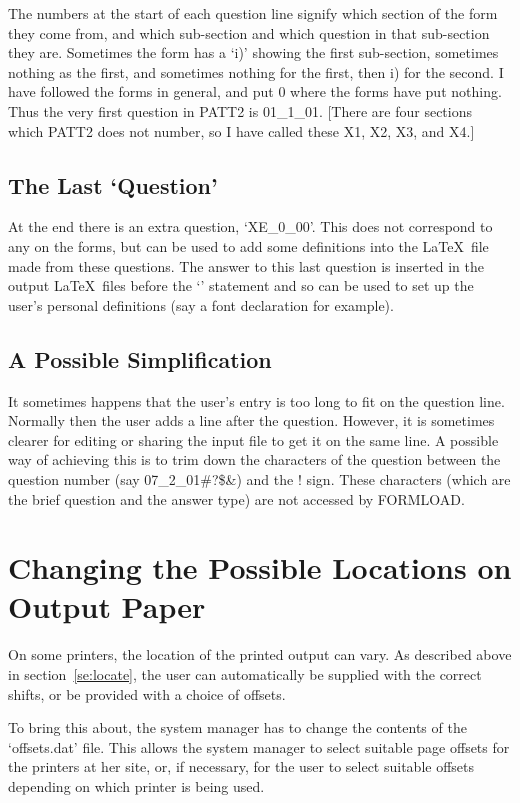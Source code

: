 The numbers at the start of each question line signify which section of the
form they come from, and which sub-section and which question in that
sub-section they are. Sometimes the form has a `i)' showing the first
sub-section, sometimes nothing as the first, and sometimes nothing for the
first, then i) for the second. I have followed the forms in general, and
put 0 where the forms have put nothing. Thus the very first question in
PATT2 is 01\_1\_01. [There are four sections which PATT2 does not number,
so I have called these X1, X2, X3, and X4.]

\subsection{The Last `Question'}

At the end there is an extra question, `XE\_0\_00'. This does not
correspond to any on the forms, but can be used to add some definitions
into the \LaTeX\ file made from these questions. The answer to this last
question is inserted in the output \LaTeX\ files before the
`\verb++' statement and so can be used to set up the user's
personal definitions (say a font declaration for example).

\subsection{A Possible Simplification}

It sometimes happens that the user's entry is too long to fit on the
question line. Normally then the user adds a line after the question.
However, it is sometimes clearer for editing or sharing the input file to
get it on the same line. A possible way of achieving this is to trim down
the characters of the question between the question number (say
07\_2\_01\#?\$\&) and the ! sign. These characters (which are the brief
question and the answer type) are not accessed by FORMLOAD.



\section{Changing the Possible Locations on Output Paper}
\label{se:offset}

On some printers, the location of the printed output can vary. As described
above in section~\ref{se:locate}, the user can automatically be supplied
with the correct shifts, or be provided with a choice of offsets.

To bring this about, the system manager has to change the contents of the
`offsets.dat' file. This allows the system manager to select suitable page
offsets for the printers at her site, or, if necessary, for the user to
select suitable offsets depending on which printer is being used.

